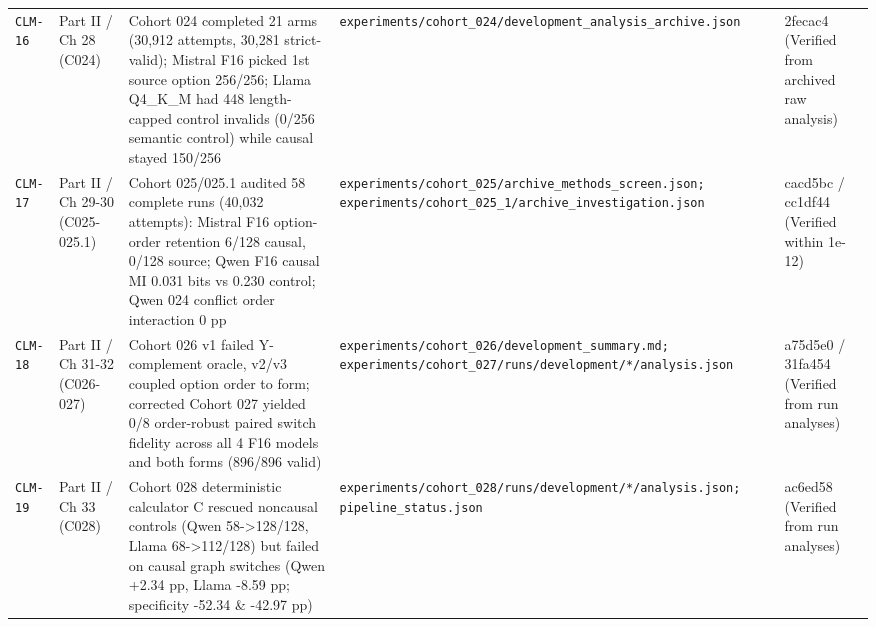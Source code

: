 {\begin{longtable}{@{}>{\raggedright\arraybackslash}p{1.2cm}>{\raggedright\arraybackslash}p{2.0cm}>{\raggedright\arraybackslash}p{4.8cm}>{\raggedright\arraybackslash}p{3.9cm}>{\raggedright\arraybackslash}p{2.5cm}@{}}
\texttt{CLM-\allowbreak{}16} & Part II /\allowbreak{} Ch 28 (C024) & Cohort 024 completed 21 arms (30,912 attempts, 30,281 strict-\allowbreak{}valid); Mistral F16 picked 1st source option 256/\allowbreak{}256; Llama Q4\_K\_M had 448 length-\allowbreak{}capped control invalids (0/\allowbreak{}256 semantic control) while causal stayed 150/\allowbreak{}256 & \texttt{experiments/\allowbreak{}cohort\_024/\allowbreak{}development\_analysis\_archive.json} & 2fecac4 (Verified from archived raw analysis) \\[2pt]
\texttt{CLM-\allowbreak{}17} & Part II /\allowbreak{} Ch 29-\allowbreak{}30 (C025-\allowbreak{}025.1) & Cohort 025/\allowbreak{}025.1 audited 58 complete runs (40,032 attempts): Mistral F16 option-\allowbreak{}order retention 6/\allowbreak{}128 causal, 0/\allowbreak{}128 source; Qwen F16 causal MI 0.031 bits vs 0.230 control; Qwen 024 conflict order interaction 0 pp & \texttt{experiments/\allowbreak{}cohort\_025/\allowbreak{}archive\_methods\_screen.json; experiments/\allowbreak{}cohort\_025\_1/\allowbreak{}archive\_investigation.json} & cacd5bc /\allowbreak{} cc1df44 (Verified within 1e-\allowbreak{}12) \\[2pt]
\texttt{CLM-\allowbreak{}18} & Part II /\allowbreak{} Ch 31-\allowbreak{}32 (C026-\allowbreak{}027) & Cohort 026 v1 failed Y-\allowbreak{}complement oracle, v2/\allowbreak{}v3 coupled option order to form; corrected Cohort 027 yielded 0/\allowbreak{}8 order-\allowbreak{}robust paired switch fidelity across all 4 F16 models and both forms (896/\allowbreak{}896 valid) & \texttt{experiments/\allowbreak{}cohort\_026/\allowbreak{}development\_summary.md; experiments/\allowbreak{}cohort\_027/\allowbreak{}runs/\allowbreak{}development/\allowbreak{}*/\allowbreak{}analysis.json} & a75d5e0 /\allowbreak{} 31fa454 (Verified from run analyses) \\[2pt]
\texttt{CLM-\allowbreak{}19} & Part II /\allowbreak{} Ch 33 (C028) & Cohort 028 deterministic calculator C rescued noncausal controls (Qwen 58-\allowbreak{}>128/\allowbreak{}128, Llama 68-\allowbreak{}>112/\allowbreak{}128) but failed on causal graph switches (Qwen +2.34 pp, Llama -\allowbreak{}8.59 pp; specificity -\allowbreak{}52.34 \& -\allowbreak{}42.97 pp) & \texttt{experiments/\allowbreak{}cohort\_028/\allowbreak{}runs/\allowbreak{}development/\allowbreak{}*/\allowbreak{}analysis.json; pipeline\_status.json} & ac6ed58 (Verified from run analyses) \\[2pt]

\end{longtable}}
